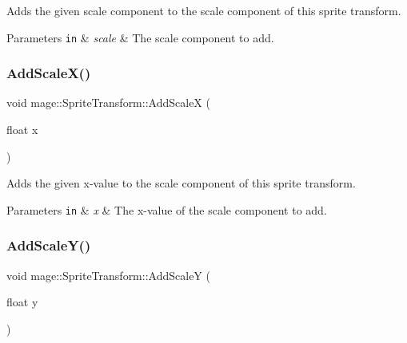 Adds the given scale component to the scale component of this sprite transform.


\begin{DoxyParams}[1]{Parameters}
\mbox{\tt in}  & {\em scale} & The scale component to add. \\
\hline
\end{DoxyParams}
\hypertarget{structmage_1_1_sprite_transform_a55739f412a5e6e94fb841f552a2b5356}{}\label{structmage_1_1_sprite_transform_a55739f412a5e6e94fb841f552a2b5356} 
\subsubsection{\texorpdfstring{Add\+Scale\+X()}{AddScaleX()}}
{\footnotesize\ttfamily void mage\+::\+Sprite\+Transform\+::\+Add\+ScaleX (\begin{DoxyParamCaption}\item[{float}]{x }\end{DoxyParamCaption})\hspace{0.3cm}{\ttfamily [noexcept]}}

Adds the given x-\/value to the scale component of this sprite transform.


\begin{DoxyParams}[1]{Parameters}
\mbox{\tt in}  & {\em x} & The x-\/value of the scale component to add. \\
\hline
\end{DoxyParams}
\hypertarget{structmage_1_1_sprite_transform_a2cc81e5af3ec1e1d78a5ba0e1abf1d4f}{}\label{structmage_1_1_sprite_transform_a2cc81e5af3ec1e1d78a5ba0e1abf1d4f} 
\subsubsection{\texorpdfstring{Add\+Scale\+Y()}{AddScaleY()}}
{\footnotesize\ttfamily void mage\+::\+Sprite\+Transform\+::\+Add\+ScaleY (\begin{DoxyParamCaption}\item[{float}]{y }\end{DoxyParamCaption})\hspace{0.3cm}{\ttfamily [noexcept]}}

